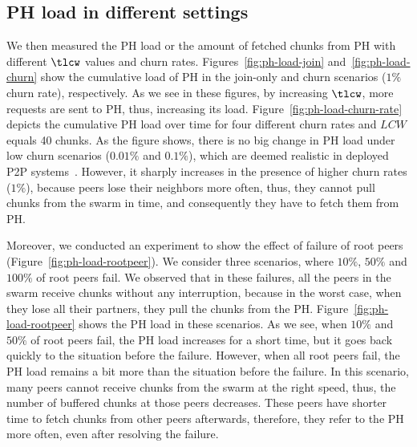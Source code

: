 {\subsection{PH load in different settings}
We then measured the PH load or the amount of fetched chunks from PH with
different $\tlcw$ values and churn rates. Figures~\ref{fig:ph-load-join}
and~\ref{fig:ph-load-churn} show the cumulative load of PH in the join-only
and churn scenarios ($1\%$ churn rate), respectively. As we see in these
figures, by increasing $\tlcw$, more requests are sent to PH, thus, increasing
its load. Figure~\ref{fig:ph-load-churn-rate} depicts the cumulative PH load
over time for four different churn rates and $LCW$ equals 40 chunks. As the
figure shows, there is no big change in PH load under low churn scenarios
($0.01\%$ and $0.1\%$), which are deemed realistic in deployed P2P
systems~\cite{churn}. However, it sharply increases in the presence of higher
churn rates ($1\%$), because peers lose their neighbors more often, thus, they
cannot pull chunks from the swarm in time, and consequently they have to fetch
them from PH.

Moreover, we conducted an experiment to show the effect of failure of root peers (Figure~\ref{fig:ph-load-rootpeer}). We consider three scenarios, where $10\%$, $50\%$ and $100\%$ of root peers fail. We observed that in these failures, all the peers in the swarm receive chunks without any interruption, because in the worst case, when they lose all their partners, they pull the chunks from the PH. Figure~\ref{fig:ph-load-rootpeer} shows the PH load in these scenarios. As we see, when $10\%$ and $50\%$ of root peers fail, the PH load increases for a short time, but it goes back quickly to the situation before the failure. However, when all root peers fail, the PH load remains a bit more than the situation before the failure. In this scenario, many peers cannot receive chunks from the swarm at the right speed, thus, the number of buffered chunks at those peers decreases. These peers have shorter time to fetch chunks from other peers afterwards, therefore, they refer to the PH more 
often, even after resolving the failure.

}
